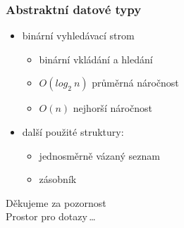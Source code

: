 \documentclass[pdf,hyperref={unicode}]{beamer}
\begin{document}
\begin{frame}
\frametitle{Abstraktní datové typy}
	\begin{itemize}
		\item binární vyhledávací strom
		 	\begin{itemize}
		 	 \item binární vkládání a hledání
		 	 \item $O(log_2 \ n)$ průměrná náročnost
		 	 \item $O(n) $ nejhorší náročnost 
		 	\end{itemize}
		 \item další použité struktury:
		  \begin{itemize}
		  \item  jednosměrně vázaný seznam
		  \item zásobník
		\end{itemize}		 
	\end{itemize}
\end{frame}


\begin{frame}
\begin{center}
{\huge Děkujeme za pozornost \\[15px] Prostor pro dotazy\,\dots}
\end{center}
\end{frame}
\end{document}

